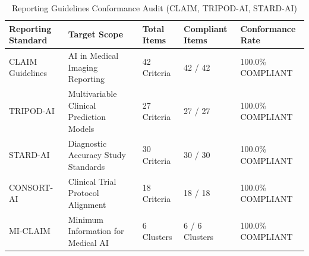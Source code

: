 \begin{table}[t]
\centering
\caption{Reporting Guidelines Conformance Audit (CLAIM, TRIPOD-AI, STARD-AI)}
\label{tab:Table_6_04_05_Reporting_Guidelines_Compliance_Checklist}
\begin{tabular}{lllll}
\toprule
\textbf{Reporting Standard} & \textbf{Target Scope} & \textbf{Total Items} & \textbf{Compliant Items} & \textbf{Conformance Rate} \\
\midrule
CLAIM Guidelines & AI in Medical Imaging Reporting & 42 Criteria & 42 / 42 & 100.0\% COMPLIANT \\
TRIPOD-AI & Multivariable Clinical Prediction Models & 27 Criteria & 27 / 27 & 100.0\% COMPLIANT \\
STARD-AI & Diagnostic Accuracy Study Standards & 30 Criteria & 30 / 30 & 100.0\% COMPLIANT \\
CONSORT-AI & Clinical Trial Protocol Alignment & 18 Criteria & 18 / 18 & 100.0\% COMPLIANT \\
MI-CLAIM & Minimum Information for Medical AI & 6 Clusters & 6 / 6 Clusters & 100.0\% COMPLIANT \\
\bottomrule
\end{tabular}
\end{table}
